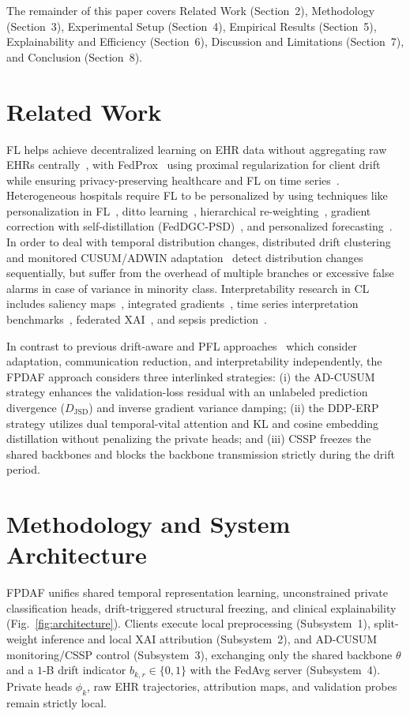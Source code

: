 \documentclass{llncs}
\begin{document}
The remainder of this paper covers Related Work (Section~2), Methodology (Section~3), Experimental Setup (Section~4), Empirical Results (Section~5), Explainability and Efficiency (Section~6), Discussion and Limitations (Section~7), and Conclusion (Section~8).

\section{Related Work}

FL helps achieve decentralized learning on EHR data without aggregating raw EHRs centrally~\cite{15}, with FedProx~\cite{25} using proximal regularization for client drift while ensuring privacy-preserving healthcare and FL on time series~\cite{1,5,6,13,14,16,17,18,20,23}. Heterogeneous hospitals require FL to be personalized by using techniques like personalization in FL~\cite{3}, ditto learning~\cite{26}, hierarchical re-weighting~\cite{4}, gradient correction with self-distillation (FedDGC-PSD)~\cite{12}, and personalized forecasting~\cite{19}. In order to deal with temporal distribution changes, distributed drift clustering~\cite{2} and monitored CUSUM/ADWIN adaptation~\cite{7} detect distribution changes sequentially, but suffer from the overhead of multiple branches or excessive false alarms in case of variance in minority class. Interpretability research in CL includes saliency maps~\cite{9}, integrated gradients~\cite{24}, time series interpretation benchmarks~\cite{10}, federated XAI~\cite{8}, and sepsis prediction~\cite{11}.

In contrast to previous drift-aware and PFL approaches~\cite{2,3,7,25,26} which consider adaptation, communication reduction, and interpretability independently, the FPDAF approach considers three interlinked strategies: (i) the AD-CUSUM strategy enhances the validation-loss residual with an unlabeled prediction divergence ($D_{\mathrm{JSD}}$) and inverse gradient variance damping; (ii) the DDP-ERP strategy utilizes dual temporal-vital attention and KL and cosine embedding distillation without penalizing the private heads; and (iii) CSSP freezes the shared backbones and blocks the backbone transmission strictly during the drift period.

\section{Methodology and System Architecture}

FPDAF unifies shared temporal representation learning, unconstrained private classification heads, drift-triggered structural freezing, and clinical explainability (Fig.~\ref{fig:architecture}). Clients execute local preprocessing (Subsystem~1), split-weight inference and local XAI attribution (Subsystem~2), and AD-CUSUM monitoring/CSSP control (Subsystem~3), exchanging only the shared backbone $\theta$ and a $1$-B drift indicator $b_{k,r}\in\{0,1\}$ with the FedAvg server (Subsystem~4). Private heads $\phi_k$, raw EHR trajectories, attribution maps, and validation probes remain strictly local.
\end{document}
